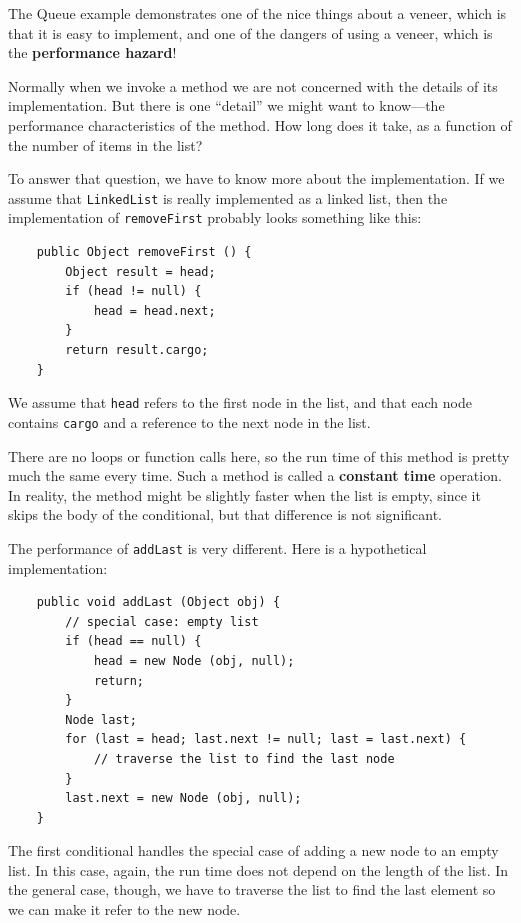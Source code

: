 \documentclass[12pt]{book}
\theoremstyle{exercise}
\begin{document}
The Queue example demonstrates one of the nice things about a
veneer, which is that it is easy to implement, and one of
the dangers of using a veneer, which is the {\bf performance
hazard}!

Normally when we invoke a method we are not concerned with the
details of its implementation.  But there is one ``detail''
we might want to know---the performance characteristics of the
method.  How long does it take, as a function of the number
of items in the list?

To answer that question, we have to know more about the
implementation.  If we assume that {\tt LinkedList} is really
implemented as a linked list, then the
implementation of {\tt removeFirst} probably looks something
like this:

\begin{verbatim}
    public Object removeFirst () {
        Object result = head;
        if (head != null) {
            head = head.next;
        }
        return result.cargo;
    }
\end{verbatim}
%
We assume that {\tt head} refers to the first node in the list,
and that each node contains {\tt cargo} and a reference to
the next node in the list.

There are no loops or function calls here, so the run time of this
method is pretty much the same every time.  Such a method is called a
{\bf constant time} operation.  In reality, the method might be
slightly faster when the list is empty, since it skips the body of the
conditional, but that difference is not significant.


The performance of {\tt addLast} is very different.  Here is
a hypothetical implementation:

\begin{verbatim}
    public void addLast (Object obj) {
        // special case: empty list
        if (head == null) {
            head = new Node (obj, null);
            return;
        }
        Node last;
        for (last = head; last.next != null; last = last.next) {
            // traverse the list to find the last node
        }
        last.next = new Node (obj, null);
    }
\end{verbatim}
%
The first conditional handles the special case of adding a new node to
an empty list.  In this case, again, the run time does not depend on
the length of the list.  In the general case, though, we have to
traverse the list to find the last element so we can make it refer to
the new node.
\end{document}
